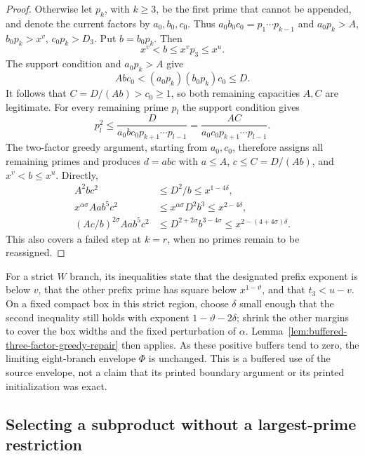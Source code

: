 \documentclass[11pt]{article}
\begin{document}
\begin{proof}
Otherwise let $p_k$, with $k\ge3$, be the first prime that cannot
be appended, and denote the current factors by $a_0,b_0,c_0$.
Thus $a_0b_0c_0=p_1\cdots p_{k-1}$ and
$a_0p_k>A$, $b_0p_k>x^v$, $c_0p_k>D_3$.
Put $b=b_0p_k$.  Then
\[
 x^v<b\le x^v p_3\le x^u.
\]
The support condition and $a_0p_k>A$ give
\[
 A b c_0<(a_0p_k)(b_0p_k)c_0\le D.
\]
It follows that $C=D/(Ab)>c_0\ge1$, so both remaining
capacities $A,C$ are legitimate.  For every remaining prime
$p_l$ the support condition gives
\[
 p_l^2\le
 \frac{D}{a_0bc_0p_{k+1}\cdots p_{l-1}}
 =\frac{AC}{a_0c_0p_{k+1}\cdots p_{l-1}}.
\]
The two-factor greedy argument, starting from $a_0,c_0$, therefore
assigns all remaining primes and produces $d=abc$ with
$a\le A$, $c\le C=D/(Ab)$, and $x^v<b\le x^u$.
Directly,
\begin{align*}
 A^2bc^2&\le D^2/b\le x^{1-4\delta},\\
 x^{\alpha\sigma}Aab^5c^2
 &\le x^{\alpha\sigma}D^2b^3\le x^{2-4\delta},\\
 (Ac/b)^{2\sigma}Aab^5c^2
 &\le D^{2+2\sigma}b^{3-4\sigma}
   \le x^{2-(4+4\sigma)\delta}.
\end{align*}
This also covers a failed step at $k=r$, when no primes remain
to be reassigned.
\end{proof}

For a strict $W$ branch, its inequalities state that the
designated prefix exponent is below $v$, that the other prefix
prime has square below $x^{1-\vartheta}$, and that
$t_3<u-v$.  On a fixed compact box in this strict region, choose
$\delta$ small enough that the second inequality still holds
with exponent $1-\vartheta-2\delta$; shrink the other margins to
cover the box widths and the fixed perturbation of $\alpha$.
Lemma~\ref{lem:buffered-three-factor-greedy-repair} then applies.
As these positive buffers tend to zero, the limiting eight-branch
envelope $\Phi$ is unchanged.  This is a buffered use of the
source envelope, not a claim that its printed boundary argument
or its printed initialization was exact.


\subsection{Selecting a subproduct without a largest-prime restriction}
\label{sec:selected-subproduct-factorization}
\end{document}

